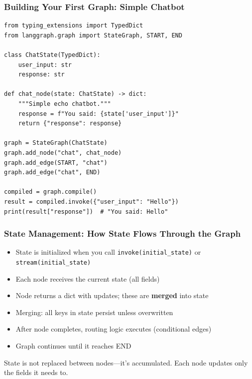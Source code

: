 \documentclass[aspectratio=169,11pt]{beamer}
\begin{document}
\begin{frame}[fragile]
\frametitle{Building Your First Graph: Simple Chatbot}
\begin{lstlisting}
from typing_extensions import TypedDict
from langgraph.graph import StateGraph, START, END

class ChatState(TypedDict):
    user_input: str
    response: str

def chat_node(state: ChatState) -> dict:
    """Simple echo chatbot."""
    response = f"You said: {state['user_input']}"
    return {"response": response}

graph = StateGraph(ChatState)
graph.add_node("chat", chat_node)
graph.add_edge(START, "chat")
graph.add_edge("chat", END)

compiled = graph.compile()
result = compiled.invoke({"user_input": "Hello"})
print(result["response"])  # "You said: Hello"
\end{lstlisting}
\end{frame}

\begin{frame}
\frametitle{State Management: How State Flows Through the Graph}
\begin{itemize}
    \setlength{\itemsep}{1pt}
  \item State is initialized when you call \texttt{invoke(initial\_state)} or \texttt{stream(initial\_state)}
  \item Each node receives the current state (all fields)
  \item Node returns a dict with updates; these are \textbf{merged} into state
  \item Merging: all keys in state persist unless overwritten
  \item After node completes, routing logic executes (conditional edges)
  \item Graph continues until it reaches END
\end{itemize}

\vspace{15pt}
\begin{conceptbox}
State is not replaced between nodes—it's accumulated. Each node updates only the fields it needs to.
\end{conceptbox}
\end{frame}
\end{document}

